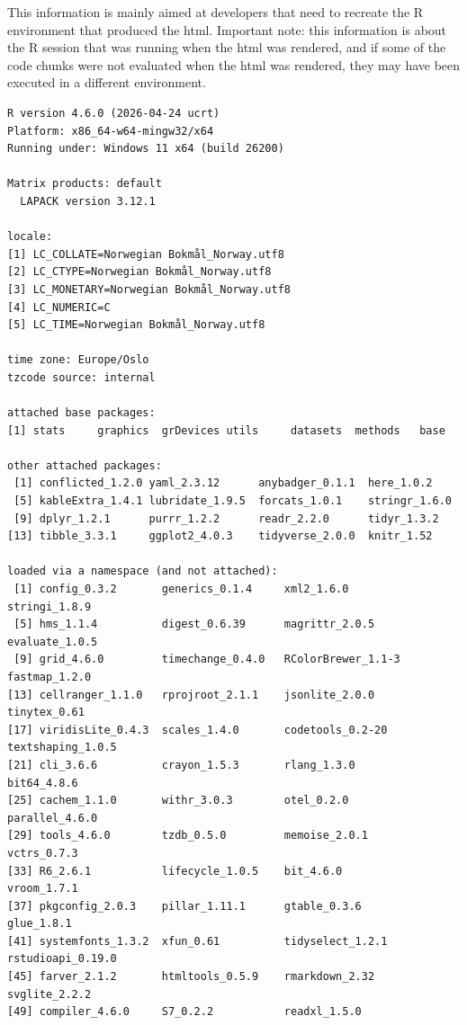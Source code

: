 \documentclass[
  letterpaper,
  DIV=11,
  numbers=noendperiod]{scrartcl}
\begin{document}
\begin{tcolorbox}[enhanced jigsaw, arc=.35mm, bottomrule=.15mm, bottomtitle=1mm, breakable, colback=white, colbacktitle=quarto-callout-tip-color!10!white, colframe=quarto-callout-tip-color-frame, coltitle=black, left=2mm, leftrule=.75mm, opacityback=0, opacitybacktitle=0.6, rightrule=.15mm, title={Session Info}, titlerule=0mm, toprule=.15mm, toptitle=1mm]

This information is mainly aimed at developers that need to recreate the
R environment that produced the html. Important note: this information
is about the R session that was running when the html was rendered, and
if some of the code chunks were not evaluated when the html was
rendered, they may have been executed in a different environment.

\begin{verbatim}
R version 4.6.0 (2026-04-24 ucrt)
Platform: x86_64-w64-mingw32/x64
Running under: Windows 11 x64 (build 26200)

Matrix products: default
  LAPACK version 3.12.1

locale:
[1] LC_COLLATE=Norwegian Bokmål_Norway.utf8 
[2] LC_CTYPE=Norwegian Bokmål_Norway.utf8   
[3] LC_MONETARY=Norwegian Bokmål_Norway.utf8
[4] LC_NUMERIC=C                            
[5] LC_TIME=Norwegian Bokmål_Norway.utf8    

time zone: Europe/Oslo
tzcode source: internal

attached base packages:
[1] stats     graphics  grDevices utils     datasets  methods   base     

other attached packages:
 [1] conflicted_1.2.0 yaml_2.3.12      anybadger_0.1.1  here_1.0.2      
 [5] kableExtra_1.4.1 lubridate_1.9.5  forcats_1.0.1    stringr_1.6.0   
 [9] dplyr_1.2.1      purrr_1.2.2      readr_2.2.0      tidyr_1.3.2     
[13] tibble_3.3.1     ggplot2_4.0.3    tidyverse_2.0.0  knitr_1.52      

loaded via a namespace (and not attached):
 [1] config_0.3.2       generics_0.1.4     xml2_1.6.0         stringi_1.8.9     
 [5] hms_1.1.4          digest_0.6.39      magrittr_2.0.5     evaluate_1.0.5    
 [9] grid_4.6.0         timechange_0.4.0   RColorBrewer_1.1-3 fastmap_1.2.0     
[13] cellranger_1.1.0   rprojroot_2.1.1    jsonlite_2.0.0     tinytex_0.61      
[17] viridisLite_0.4.3  scales_1.4.0       codetools_0.2-20   textshaping_1.0.5 
[21] cli_3.6.6          crayon_1.5.3       rlang_1.3.0        bit64_4.8.6       
[25] cachem_1.1.0       withr_3.0.3        otel_0.2.0         parallel_4.6.0    
[29] tools_4.6.0        tzdb_0.5.0         memoise_2.0.1      vctrs_0.7.3       
[33] R6_2.6.1           lifecycle_1.0.5    bit_4.6.0          vroom_1.7.1       
[37] pkgconfig_2.0.3    pillar_1.11.1      gtable_0.3.6       glue_1.8.1        
[41] systemfonts_1.3.2  xfun_0.61          tidyselect_1.2.1   rstudioapi_0.19.0 
[45] farver_2.1.2       htmltools_0.5.9    rmarkdown_2.32     svglite_2.2.2     
[49] compiler_4.6.0     S7_0.2.2           readxl_1.5.0      
\end{verbatim}

\end{tcolorbox}
\end{document}
